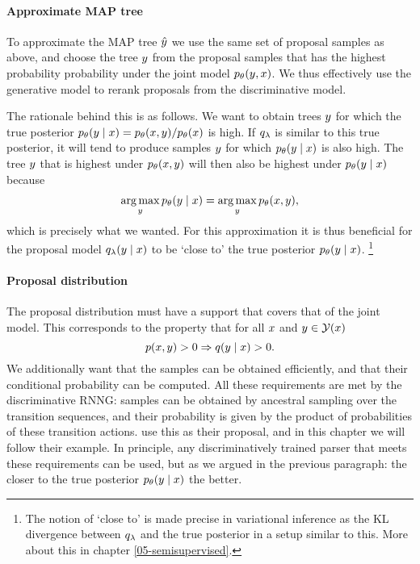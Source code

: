     \paragraph{Approximate MAP tree}
      To approximate the MAP tree $\hat{y}$ we use the same set of proposal samples as above, and choose the tree $y$ from the proposal samples that has the highest probability probability under the joint model $p_{\theta}( y, x)$. We thus effectively use the generative model to rerank proposals from the discriminative model.

      The rationale behind this is as follows. We want to obtain trees $y$ for which the true posterior $p_{\theta}(y \mid x) = p_{\theta}( x, y ) /p_{\theta}(x)$ is high. If $q_{\lambda}$ is similar to this true posterior, it will tend to produce samples $y$ for which $p_{\theta}(y \mid x)$ is also high. The tree $y$ that is highest under $p_{\theta}( x, y )$ will then also be highest under $ p_{\theta}( y \mid x )$ because
      \begin{align*}
        \operatorname*{arg\,max}_y p_{\theta}( y \mid x ) = \operatorname*{arg\,max}_y p_{\theta}(x, y),
      \end{align*}
      which is precisely what we wanted. For this approximation it is thus beneficial for the proposal model $q_{\lambda}(y \mid x)$ to be `close to' the true posterior $p_{\theta}(y \mid x)$. \footnote{The notion of `close to' is made precise in variational inference as the KL divergence between $q_{\lambda}$ and the true posterior in a setup similar to this. More about this in chapter \ref{05-semisupervised}.}

    \paragraph{Proposal distribution}
      The proposal distribution must have a support that covers that of the joint model. This corresponds to the property that for all $x$ and $y \in \mathcal{Y}(x)$
      \begin{equation*}
        p(x, y) > 0 \Rightarrow q( y \mid x ) > 0.
      \end{equation*}
      We additionally want that the samples can be obtained efficiently, and that their conditional probability can be computed. All these requirements are met by the discriminative RNNG: samples can be obtained by ancestral sampling over the transition sequences, and their probability is given by the product of probabilities of these transition actions. \citet{dyer2016rnng} use this as their proposal, and in this chapter we will follow their example. In principle, any discriminatively trained parser that meets these requirements can be used, but as we argued in the previous paragraph: the closer to the true posterior $p_{\theta}(y \mid x)$ the better.

